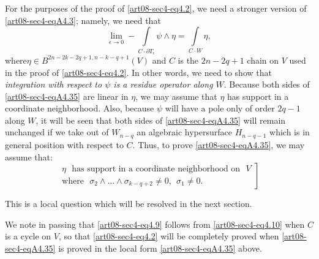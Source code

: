 For the purposes of the proof of \eqref{art08-sec4-eq4.2}, we need a stronger version of \eqref{art08-sec4-eqA4.3}; namely, we need that
\begin{equation*}
\lim\limits_{\epsilon\to 0}-\int\limits_{C\cdot \partial T_{\epsilon}}\psi \wedge \eta=\int\limits_{C\cdot W}\eta,\tag{A4.35}\label{art08-sec4-eqA4.35}
\end{equation*}
where\pageoriginale $\eta\in B^{2n-2k-2q+1,n-k-q+1}(V)$ and $C$ is the $2n-2q+1$ chain on $V$ used in the proof of \eqref{art08-sec4-eq4.2}. In other words, we need to show that {\em integration with respect to $\psi$ is a residue operator along $W$}. Because both sides of \eqref{art08-sec4-eqA4.35} are linear in $\eta$, we may assume that $\eta$ has support in a coordinate neighborhood. Also, because $\psi$ will have a pole only of order $2q-1$ along $W$, it will be seen that both sides of \eqref{art08-sec4-eqA4.35} will remain unchanged if we take out of $W_{n-q}$ an algebraic hypersurface $H_{n-q-1}$ which is in general position with respect to $C$. Thus, to prove \eqref{art08-sec4-eqA4.35}, we may assume that:
\begin{equation*}
\left.
\begin{array}{l}
\eta\text{~ has support in a coordinate neighborhood on~ } V\\[3pt]
\text{where~ } \sigma_{2}\wedge\ldots\wedge \sigma_{k-q+2}\neq 0, \ \ \sigma_{1}\neq  0.
\end{array}\right]\tag{A4.36}\label{art08-sec4-eqA4.36}
\end{equation*}

This is a local question which will be resolved in the next section.

We note in passing that \eqref{art08-sec4-eq4.9} follows from \eqref{art08-sec4-eq4.10} when $C$ is a cycle on $V$, so that \eqref{art08-sec4-eq4.2} will be completely proved when \eqref{art08-sec4-eqA4.35} is proved in the local form \eqref{art08-sec4-eqA4.35} above.

\eject

